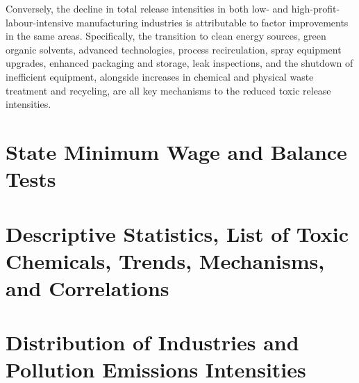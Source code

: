 \documentclass[authoryear, preprint, twocolumn, 1p]{elsarticle}
\begin{document}
    Conversely, the decline in total release intensities in both low- and high-profit-labour-intensive manufacturing industries is attributable to factor improvements in the same areas. Specifically, the transition to clean energy sources, green organic solvents, advanced technologies, process recirculation, spray equipment upgrades, enhanced packaging and storage, leak inspections, and the shutdown of inefficient equipment, alongside increases in chemical and physical waste treatment and recycling, are all key mechanisms to the reduced toxic release intensities.
    \begin{appendices}
        \renewcommand\thesection{\Roman{section}} %
        \renewcommand\thesubsection{\Alph{subsection}} %


        \section{State Minimum Wage and Balance Tests}\label{sec:appendix-state-minimum-wage-and-balance-tests}
        
        
        
        
        


        \section{Descriptive Statistics, List of Toxic Chemicals, Trends, Mechanisms, and Correlations}\label{sec:appendix-descriptive-stat-list-of-toxic-chemicals-trends-mechanisms-and-correlations}
%    
        
        


        \section{Distribution of Industries and Pollution Emissions Intensities}\label{sec:appendix-distribution-of-industries-and-pollution-emissions-intensities}
        
        
%        
%        
%        
%        
%        
%        
%        
%        
%        
%        
%        



\end{appendices}
\end{document}
